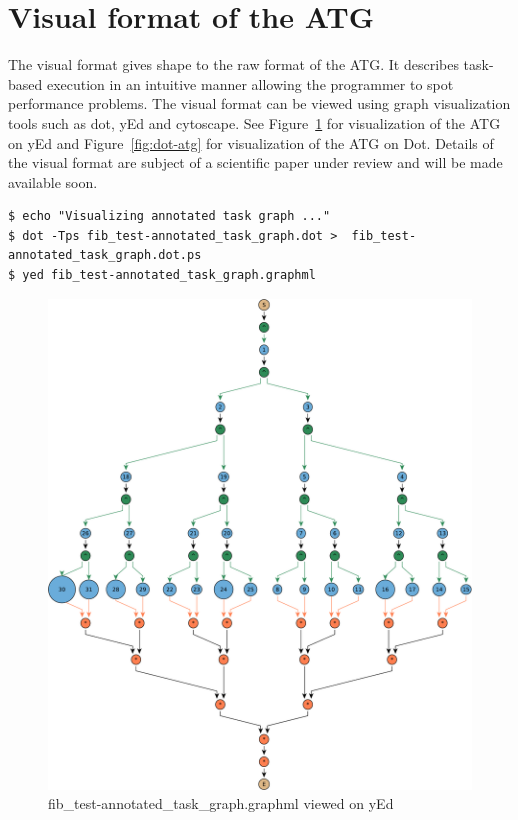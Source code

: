 \documentclass[11pt,a4paper,notitlepage]{article}
\begin{document}
\section{Visual format of the ATG}
The visual format gives shape to the raw format of the ATG.
It describes task-based execution in an intuitive manner allowing the programmer to spot performance problems.
The visual format can be viewed using graph visualization tools such as dot, yEd and cytoscape.
See Figure~\ref{fig:yed-atg} for visualization of the ATG on yEd and Figure~\ref{fig:dot-atg} for visualization of the ATG on Dot.
Details of the visual format are subject of a scientific paper under review and will be made available soon.

\begin{lstlisting}[style=BashInputStyle]
$ echo "Visualizing annotated task graph ..."
$ dot -Tps fib_test-annotated_task_graph.dot >  fib_test-annotated_task_graph.dot.ps
$ yed fib_test-annotated_task_graph.graphml
\end{lstlisting}

\begin{figure}[!ht]
\centering
\includegraphics[width=\textwidth]{figures/fib_test-10_4-annotated_task_graph-yed.pdf}
\caption{fib\_test-annotated\_task\_graph.graphml viewed on yEd}
\label{fig:yed-atg}
\end{figure}
\end{document}
